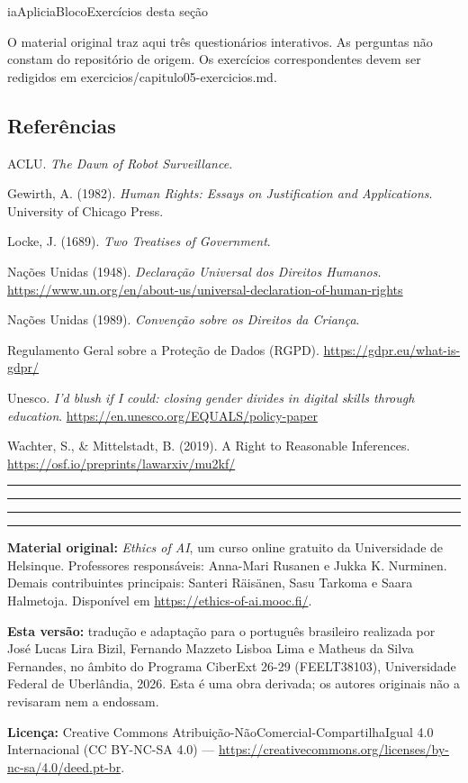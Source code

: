 \documentclass[
  11pt,
]{article}
\newcommand{\faixaEixos}[1][\linewidth]{%
  \noindent
  \textcolor{iaConceitos}{\rule{0.3333#1}{4pt}}%
  \textcolor{iaAplic}{\rule{0.3333#1}{4pt}}%
  \textcolor{iaRiscos}{\rule{0.3333#1}{4pt}}%
  \par}
\renewcommand{\texttt}[1]{{\color{iaAmeixa}\small\ttfamily #1}}
\newenvironment{reflexao}[1][Para pensar]{\begin{iabox}{iaAplic}{iaBloco}{#1}}{\end{iabox}}
\newenvironment{licenca}
  {\par\vspace{2em}\faixaEixos\par\vspace{0.8em}
   \begingroup\sffamily\scriptsize\color{iaTintaFraca}}
  {\endgroup\par}
\begin{document}
\begin{reflexao}[Exercícios desta seção]

O material original traz aqui três questionários interativos. As
perguntas não constam do repositório de origem. Os exercícios
correspondentes devem ser redigidos em
\texttt{exercicios/capitulo05-exercicios.md}.

\end{reflexao}

\subsection{Referências}\label{referuxeancias}

ACLU. \emph{The Dawn of Robot Surveillance}.

Gewirth, A. (1982). \emph{Human Rights: Essays on Justification and
Applications}. University of Chicago Press.

Locke, J. (1689). \emph{Two Treatises of Government}.

Nações Unidas (1948). \emph{Declaração Universal dos Direitos Humanos}.
\url{https://www.un.org/en/about-us/universal-declaration-of-human-rights}

Nações Unidas (1989). \emph{Convenção sobre os Direitos da Criança}.

Regulamento Geral sobre a Proteção de Dados (RGPD).
\url{https://gdpr.eu/what-is-gdpr/}

Unesco. \emph{I'd blush if I could: closing gender divides in digital
skills through education}.
\url{https://en.unesco.org/EQUALS/policy-paper}

Wachter, S., \& Mittelstadt, B. (2019). A Right to Reasonable
Inferences. \url{https://osf.io/preprints/lawarxiv/mu2kf/}

\begin{center}\rule{0.5\linewidth}{0.5pt}\end{center}

\begin{licenca}

\textbf{Material original:} \emph{Ethics of AI}, um curso online
gratuito da Universidade de Helsinque. Professores responsáveis:
Anna-Mari Rusanen e Jukka K. Nurminen. Demais contribuintes principais:
Santeri Räisänen, Sasu Tarkoma e Saara Halmetoja. Disponível em
\url{https://ethics-of-ai.mooc.fi/}.

\textbf{Esta versão:} tradução e adaptação para o português brasileiro
realizada por José Lucas Lira Bizil, Fernando Mazzeto Lisboa Lima e
Matheus da Silva Fernandes, no âmbito do Programa CiberExt 26-29
(FEELT38103), Universidade Federal de Uberlândia, 2026. Esta é uma obra
derivada; os autores originais não a revisaram nem a endossam.

\textbf{Licença:} Creative Commons
Atribuição-NãoComercial-CompartilhaIgual 4.0 Internacional (CC BY-NC-SA
4.0) ---
\url{https://creativecommons.org/licenses/by-nc-sa/4.0/deed.pt-br}.

\end{licenca}
\end{document}
